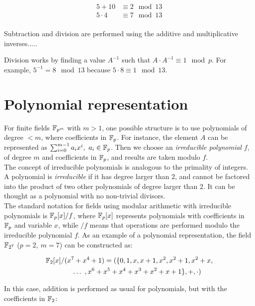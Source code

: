 \begin{align*}
5 + 10 &\equiv 2 \mod 13 \\
5 \cdot 4 &\equiv 7 \mod 13 \\
\end{align*}

Subtraction and division are performed using the additive and multiplicative inverses..... %

Division works by finding a value $A^{-1}$ such that $A \cdot A^{-1} \equiv 1 \mod p$. For example, $5^{-1} = 8 \mod 13$ because $5 \cdot 8 \equiv 1 \mod 13$.

\section{Polynomial representation} \label{background:polynomial_representation}

For finite fields $\mathbb{F}_{p^m}$ with $m > 1$, one possible structure is to use polynomials of degree $<m$, where coefficients in $\mathbb{F}_{p}$. For instance, the element $A$ can be represented as $\sum_{i=0}^{m-1} a_i x^i,~a_i \in \mathbb{F}_{p}$. Then we choose an \emph{irreducible polynomial} $f$, of degree $m$ and coefficients in $\mathbb{F}_{p}$, and results are taken modulo $f$.\\

The concept of irreducible polynomials is analogous to the primality of integers. A polynomial is \emph{irreducible} if it has degree larger than $2$, and cannot be factored into the product of two other polynomials of degree larger than $2$. It can be thought as a polynomial with no non-trivial divisors.\\

The standard notation for fields using modular arithmetic with irreducible polynomials is $\mathbb{F}_p[x]/f$, where $\mathbb{F}_p[x]$ represents polynomials with coefficients in $\mathbb{F}_p$ and variable $x$, while $/f$ means that operations are performed modulo the irreducible polynomial $f$. As an example of a polynomial representation, the field $\mathbb{F}_{2^7}$ ($p=2,~m=7$) can be constructed as:

\begin{gather*}
\mathbb{F}_{2}[x]/(x^7+x^4+1) = (\{0, 1, x, x+1, x^2, x^2+1, x^2+x, \\
\hspace{8mm} \ldots~, x^6+x^5+x^4+x^3+x^2+x+1\}, +, \cdot)
\end{gather*}

In this case, addition is performed as usual for polynomials, but with the coefficients in $\mathbb{F}_2$:

